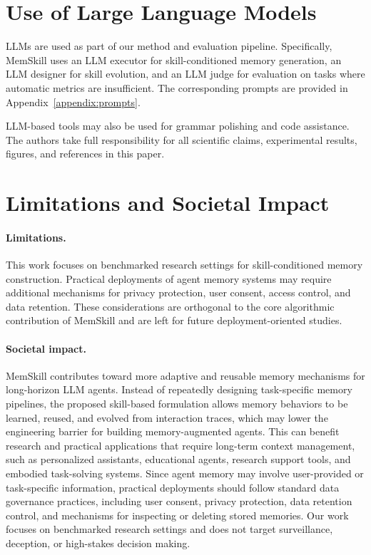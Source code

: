 \section{Use of Large Language Models}
\label{app:llm_usage}

LLMs are used as part of our method and evaluation pipeline. Specifically, MemSkill uses an LLM executor for skill-conditioned memory generation, an LLM designer for skill evolution, and an LLM judge for evaluation on tasks where automatic metrics are insufficient. The corresponding prompts are provided in Appendix~\ref{appendix:prompts}.

LLM-based tools may also be used for grammar polishing and code assistance. The authors take full responsibility for all scientific claims, experimental results, figures, and references in this paper.



\section{Limitations and Societal Impact}
\label{app:limitations_impact}

\paragraph{Limitations.}
This work focuses on benchmarked research settings for skill-conditioned memory construction. Practical deployments of agent memory systems may require additional mechanisms for privacy protection, user consent, access control, and data retention. These considerations are orthogonal to the core algorithmic contribution of MemSkill and are left for future deployment-oriented studies.


\paragraph{Societal impact.}
MemSkill contributes toward more adaptive and reusable memory mechanisms for long-horizon LLM agents. Instead of repeatedly designing task-specific memory pipelines, the proposed skill-based formulation allows memory behaviors to be learned, reused, and evolved from interaction traces, which may lower the engineering barrier for building memory-augmented agents. This can benefit research and practical applications that require long-term context management, such as personalized assistants, educational agents, research support tools, and embodied task-solving systems. Since agent memory may involve user-provided or task-specific information, practical deployments should follow standard data governance practices, including user consent, privacy protection, data retention control, and mechanisms for inspecting or deleting stored memories. Our work focuses on benchmarked research settings and does not target surveillance, deception, or high-stakes decision making.
